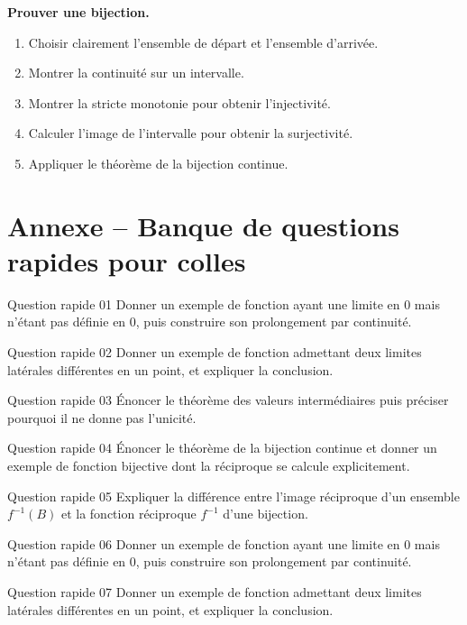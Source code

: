 \documentclass[11pt,a4paper]{article}
\begin{document}
\begin{fichebox}
\textbf{Prouver une bijection.}
\begin{enumerate}
\item Choisir clairement l'ensemble de départ et l'ensemble d'arrivée.
\item Montrer la continuité sur un intervalle.
\item Montrer la stricte monotonie pour obtenir l'injectivité.
\item Calculer l'image de l'intervalle pour obtenir la surjectivité.
\item Appliquer le théorème de la bijection continue.
\end{enumerate}
\end{fichebox}
\section{Annexe -- Banque de questions rapides pour colles}
\begin{exobox}{Question rapide 01}
Donner un exemple de fonction ayant une limite en $0$ mais n'étant pas définie en $0$, puis construire son prolongement par continuité.
\end{exobox}
\begin{exobox}{Question rapide 02}
Donner un exemple de fonction admettant deux limites latérales différentes en un point, et expliquer la conclusion.
\end{exobox}
\begin{exobox}{Question rapide 03}
Énoncer le théorème des valeurs intermédiaires puis préciser pourquoi il ne donne pas l'unicité.
\end{exobox}
\begin{exobox}{Question rapide 04}
Énoncer le théorème de la bijection continue et donner un exemple de fonction bijective dont la réciproque se calcule explicitement.
\end{exobox}
\begin{exobox}{Question rapide 05}
Expliquer la différence entre l'image réciproque d'un ensemble $f^{-1}(B)$ et la fonction réciproque $f^{-1}$ d'une bijection.
\end{exobox}
\begin{exobox}{Question rapide 06}
Donner un exemple de fonction ayant une limite en $0$ mais n'étant pas définie en $0$, puis construire son prolongement par continuité.
\end{exobox}
\begin{exobox}{Question rapide 07}
Donner un exemple de fonction admettant deux limites latérales différentes en un point, et expliquer la conclusion.
\end{exobox}
\end{document}
